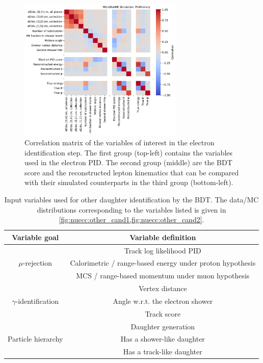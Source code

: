 \begin{figure}[htb]
\centering
\includegraphics[width=0.7\textwidth]{NueCCsel/Images/truth/e_cand_corr.pdf}
\caption[Correlation matrix of the variables of interest in the electron identification step]{Correlation matrix of the variables of interest in the electron identification step. The first group (top-left) contains the variables used in the electron PID. The second group (middle) are the BDT score and the reconstructed lepton kinematics that can be compared with their simulated counterparts in the third group (bottom-left).}
\label{fig:nuecc:corr_electrons}
\end{figure}

\clearpage
\begin{table}[htb]
\caption{\label{tab:nuecc:d_bdt} Input variables used for other daughter identification by the BDT. The data/MC distributions corresponding to the variables listed is given in \cref{fig:nuecc:other_cand1,fig:nuecc:other_cand2}.}
\centering
\setlength{\tabcolsep}{10pt}
\renewcommand{\arraystretch}{1.25}
\begin{tabular}{|c|c|}
\hline
Variable goal                            & Variable definition             \\ \hline \hline
\multirow{3}{*}{$\mu$-rejection}         & Track log likelihood PID    \\ 
                                         & Calorimetric / range-based energy under proton hypothesis \\
                                         & MCS / range-based momentum under muon hypothesis \\
\hline
\multirow{3}{*}{$\gamma$-identification} & Vertex distance            \\
                                    & Angle w.r.t. the electron shower \\
                                    & Track score                \\ \hline
\multirow{3}{*}{Particle hierarchy} & Daughter generation        \\
                                    & Has a shower-like daughter \\
                                    & Has a track-like daughter  \\ \hline
\end{tabular}
\end{table}

